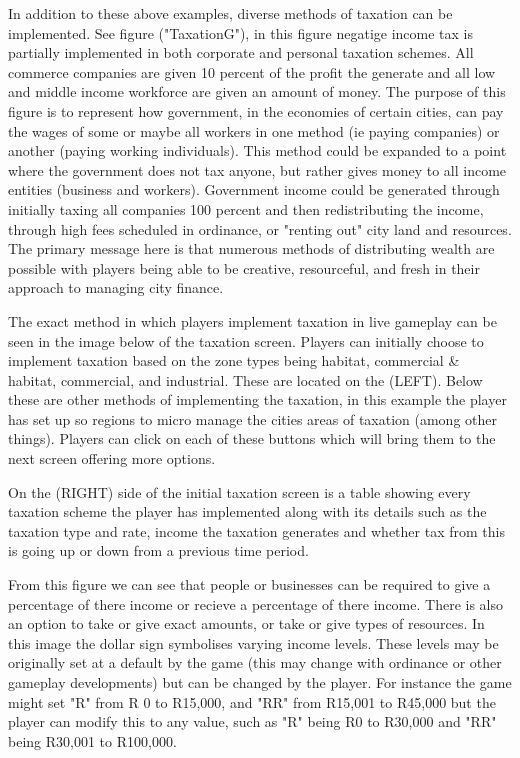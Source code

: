 In addition to these above examples, diverse methods of taxation can be implemented. See figure ("TaxationG"), in this figure negatige income tax is partially implemented in both corporate and personal taxation schemes. All commerce companies are given 10 percent of the profit the generate and all low and middle income workforce are given an amount of money. The purpose of this figure is to represent how government, in the economies of certain cities, can pay the wages of some or maybe all workers in one method (ie paying companies) or another (paying working individuals). This method could be expanded to a point where the government does not tax anyone, but rather gives money to all income entities (business and workers). Government income could be generated through initially taxing all companies 100 percent and then redistributing the income, through high fees scheduled in ordinance, or "renting out" city land and resources. The primary message here is that numerous methods of distributing wealth are possible with players being able to be creative, resourceful, and fresh in their approach to managing city finance.


The exact method in which players implement taxation in live gameplay can be seen in the image below of the taxation screen.
Players can initially choose to implement taxation based on the zone types being habitat, commercial &  habitat, commercial, and industrial. These are located on the (LEFT). Below these are other methods of implementing the taxation, in this example the player has set up so regions to micro manage the cities areas of taxation (among other things). Players can click on each of these buttons which will bring them to the next screen offering more options. 

On the (RIGHT) side of the initial taxation screen is a table showing every taxation scheme the player has implemented along with its details such as the taxation type and rate, income the taxation generates and whether tax from this is going up or down from a previous time period.



From this figure we can see that people or businesses can be required to give a percentage of there income or recieve a percentage of there income. There is also an option to take or give exact amounts, or take or give types of resources. In this image the dollar sign symbolises varying income levels. These levels may be originally set at a default by the game (this may change with ordinance or other gameplay developments) but can be changed by the player. For instance the game might set "R" from R 0 to R15,000, and "RR" from R15,001 to R45,000 but the player can modify this to any value, such as "R" being R0 to R30,000 and "RR" being R30,001 to R100,000. 

